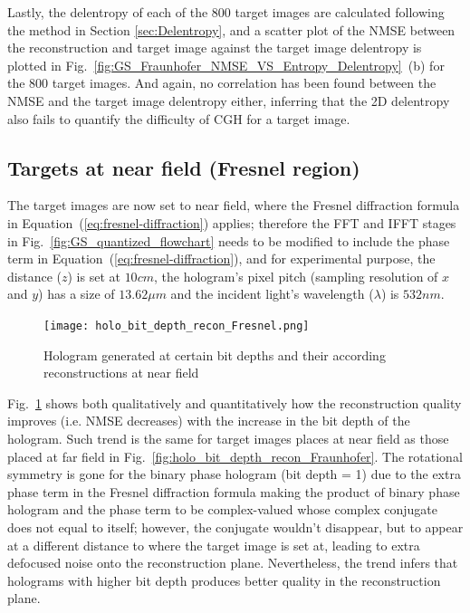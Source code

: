 	Lastly, the delentropy of each of the 800 target images are calculated following the method in Section \ref{sec:Delentropy}, and a scatter plot of the NMSE between the reconstruction and target image against the target image delentropy is plotted in Fig.~\ref{fig:GS_Fraunhofer_NMSE_VS_Entropy_Delentropy}~(b) for the 800 target images. And again, no correlation has been found between the NMSE and the target image delentropy either, inferring that the 2D delentropy also fails to quantify the difficulty of CGH for a target image.
	
	
\subsection{Targets at near field (Fresnel region)}
	The target images are now set to near field, where the Fresnel diffraction formula in Equation~(\ref{eq:fresnel-diffraction}) applies; therefore the FFT and IFFT stages in Fig.~\ref{fig:GS_quantized_flowchart} needs to be modified to include the phase term in Equation~(\ref{eq:fresnel-diffraction}), and for experimental purpose, the distance ($z$) is set at $10cm$, the hologram's pixel pitch (sampling resolution of $x$ and $y$) has a size of $13.62\mu m$ and the incident light's wavelength ($\lambda$) is $532nm$.
	\begin{figure} [ht]
	   \begin{center}
	   \texttt{[image: holo\_bit\_depth\_recon\_Fresnel.png]}
	   \end{center}
	   \caption{\label{fig:holo_bit_depth_recon_Fresnel} Hologram generated at certain bit depths and their according reconstructions at near field}
	\end{figure} 
	
	Fig.~\ref{fig:holo_bit_depth_recon_Fresnel} shows both qualitatively and quantitatively how the reconstruction quality improves (i.e. NMSE decreases) with the increase in the bit depth of the hologram. Such trend is the same for target images places at near field as those placed at far field in Fig.~\ref{fig:holo_bit_depth_recon_Fraunhofer}. The rotational symmetry is gone for the binary phase hologram (bit depth = 1) due to the extra phase term in the Fresnel diffraction formula making the product of binary phase hologram and the phase term to be complex-valued whose complex conjugate does not equal to itself; however, the conjugate wouldn't disappear, but to appear at a different distance to where the target image is set at, leading to extra defocused noise onto the reconstruction plane. Nevertheless, the trend infers that holograms with higher bit depth produces better quality in the reconstruction plane.
	
